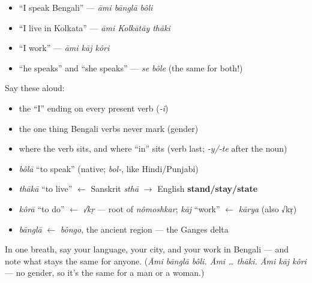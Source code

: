 \begin{itemize}
\raggedright
  \item \textquotedblleft{}I speak Bengali\textquotedblright{} — \emph{āmi bānglā bôli}
  \item \textquotedblleft{}I live in Kolkata\textquotedblright{} — \emph{āmi Kolkātāy thāki}
  \item \textquotedblleft{}I work\textquotedblright{} — \emph{āmi kāj kôri}
  \item \textquotedblleft{}he speaks\textquotedblright{} and \textquotedblleft{}she speaks\textquotedblright{} — \emph{se bôle} (the same for both!)
\end{itemize}

\begin{grammarlens}[title={Grammar lens — the engine}]
Say these aloud:

\begin{itemize}
\raggedright
  \item the \textquotedblleft{}I\textquotedblright{} ending on every present verb (\emph{-i})
  \item the one thing Bengali verbs never mark (gender)
  \item where the verb sits, and where \textquotedblleft{}in\textquotedblright{} sits (verb last; \emph{-y/-te} after the noun)
\end{itemize}
\end{grammarlens}

\begin{grammarlens}[title={What you've built — roots you now carry}]
\begin{itemize}
\raggedright
  \item \emph{bôlā} \textquotedblleft{}to speak\textquotedblright{} (native; \emph{bol-}, like Hindi/Punjabi)
  \item \emph{thākā} \textquotedblleft{}to live\textquotedblright{} $\leftarrow$ Sanskrit \emph{sthā} $\to$ English \textbf{stand/stay/state}
  \item \emph{kôrā} \textquotedblleft{}to do\textquotedblright{} $\leftarrow$ \emph{√kṛ} — root of \emph{nômoshkar}; \emph{kāj} \textquotedblleft{}work\textquotedblright{} $\leftarrow$ \emph{kārya} (also √kṛ)
  \item \emph{bānglā} $\leftarrow$ \emph{bôngo}, the ancient region — the Ganges delta
\end{itemize}
\end{grammarlens}

\begin{tcolorbox}[breakable,colback=teal!4,colframe=teal!35!black,title={Before you move on}]
In one breath, say your language, your city, and your work in Bengali — and note what stays the same for anyone. (\emph{Āmi bānglā bôli. Āmi … thāki. Āmi kāj kôri} — no gender, so it's the same for a man or a woman.)
\end{tcolorbox}

